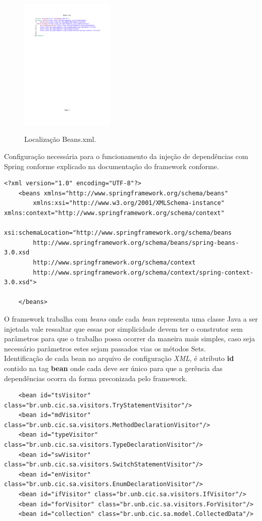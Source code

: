 \begin{figure}[h]
	\center
	\includegraphics[width=0.4\textwidth]{Imagens/Beans}
	\label{ProjectAnalyser}
	\caption{Localização Beans.xml.}
\end{figure}
\clearpage

Configuração necessária para o funcionamento da injeção de dependências com Spring conforme explicado na documentação do framework conforme\cite{SPRING_REF}.\\
\begin{lstlisting}
<?xml version="1.0" encoding="UTF-8"?>
	<beans xmlns="http://www.springframework.org/schema/beans"
		xmlns:xsi="http://www.w3.org/2001/XMLSchema-instance" xmlns:context="http://www.springframework.org/schema/context"
		xsi:schemaLocation="http://www.springframework.org/schema/beans 
		http://www.springframework.org/schema/beans/spring-beans-3.0.xsd
		http://www.springframework.org/schema/context 
		http://www.springframework.org/schema/context/spring-context-3.0.xsd">

	</beans>
\end{lstlisting}


O framework trabalha com \textit{beans} onde cada \textit{bean} representa uma classe Java a ser injetada vale ressaltar que essas por simplicidade devem ter o construtor sem parâmetros para que o trabalho possa ocorrer da maneira mais simples, caso seja necessário parâmetros estes sejam passados vias os métodos Sets.\\

Identificação de cada bean no arquivo de configuração \textit{XML}, é atributo \textbf{id} contido na tag \textbf{bean} onde cada deve ser único para que a gerência das dependências ocorra da forma preconizada pelo framework.\\
\begin{lstlisting}
	<bean id="tsVisitor" class="br.unb.cic.sa.visitors.TryStatementVisitor"/>
	<bean id="mdVisitor" class="br.unb.cic.sa.visitors.MethodDeclarationVisitor"/>
	<bean id="typeVisitor" class="br.unb.cic.sa.visitors.TypeDeclarationVisitor"/>
	<bean id="swVisitor" class="br.unb.cic.sa.visitors.SwitchStatementVisitor"/>
	<bean id="enVisitor" class="br.unb.cic.sa.visitors.EnumDeclarationVisitor"/>
	<bean id="ifVisitor" class="br.unb.cic.sa.visitors.IfVisitor"/>
	<bean id="forVisitor" class="br.unb.cic.sa.visitors.ForVisitor"/>
	<bean id="collection" class="br.unb.cic.sa.model.CollectedData"/>
\end{lstlisting}
\clearpage

